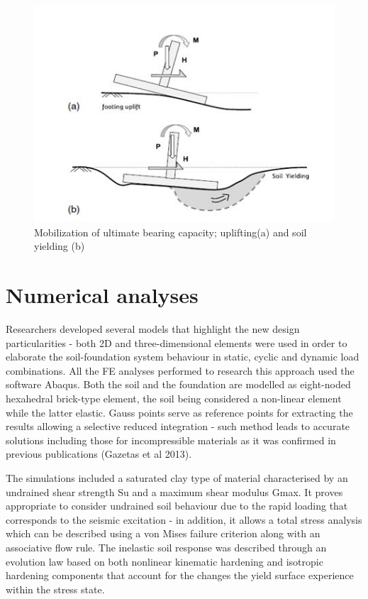 \documentclass[10pt,a4paper]{report}
\begin{document}
\begin{figure}[h!]
	\centering
	\includegraphics[width=0.8\linewidth]{"uplift"}
	\caption{Mobilization of ultimate bearing capacity; uplifting(a) and soil yielding (b)}
	\label{uplift}
\end{figure}

\section{Numerical analyses}
Researchers developed several models that highlight the new design particularities - both 2D and three-dimensional elements were used in order to elaborate the soil-foundation system behaviour in static, cyclic and dynamic load combinations. All the FE analyses performed to research this approach used the software Abaqus. Both the soil and the foundation are modelled as eight-noded hexahedral brick-type element, the soil being considered a non-linear element while the latter elastic. Gauss points serve as reference points for extracting the results allowing a selective reduced integration - such method leads to accurate solutions including those for incompressible materials as it was confirmed in previous publications (Gazetas et al 2013).

The simulations included a saturated clay type of material characterised by an undrained shear strength Su and a maximum shear modulus Gmax. It proves appropriate to consider undrained soil behaviour due to the rapid loading that corresponds to the seismic excitation - in addition, it allows a total stress analysis which can be described using a von Mises failure criterion along with an associative flow rule. The inelastic soil response was described through an evolution law based on both nonlinear kinematic hardening and isotropic  hardening components that account for the changes the yield surface experience within the stress state.
\end{document}
